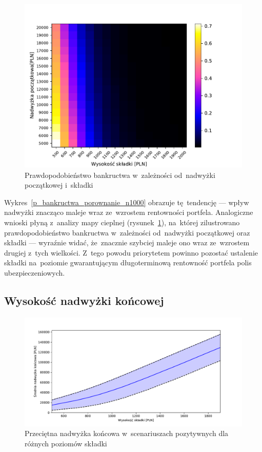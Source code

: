 \documentclass[12pt, a4paper, oneside]{mwart} %
\begin{document}
\begin{figure}
\centering
\includegraphics[width = \textwidth]{wykresy/p_heatmapa_bankructwo.pdf}
\caption{Prawdopodobieństwo bankructwa w~zależności od~nadwyżki początkowej i~składki}
\label{p_heatmapa_bankructwo}
\end{figure}

Wykres~\ref{p_bankructwa_porownanie_n1000} obrazuje tę~tendencję --- wpływ nadwyżki znacząco maleje wraz ze~wzrostem rentowności portfela. Analogiczne wnioski płyną z~analizy mapy cieplnej (rysunek~\ref{p_heatmapa_bankructwo}), na~której zilustrowano prawdopodobieństwo bankructwa w~zależności od~nadwyżki początkowej oraz składki --- wyraźnie widać, że~znacznie szybciej maleje ono wraz ze~wzrostem drugiej z~tych wielkości. Z~tego powodu priorytetem powinno pozostać ustalenie składki na~poziomie gwarantującym długoterminową rentowność portfela polis ubezpieczeniowych.

\subsection{Wysokość nadwyżki końcowej}

\begin{figure}
\centering
\includegraphics[width = \textwidth]{n=1000/nadwyzka.pdf}
\caption{Przeciętna nadwyżka końcowa w~scenariuszach pozytywnych dla różnych poziomów składki}
\label{nadwyzka_n1000}
\end{figure}
\end{document}

